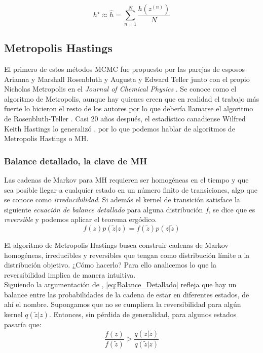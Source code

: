 \begin{equation*}
h^\star \approx \hat{h} = \sum\limits_{n=1}^N \dfrac{h\left(z^{(n)}\right)}{N}
\end{equation*}

\subsection{Metropolis Hastings}

 El primero de estos métodos MCMC fue propuesto por las parejas de esposos Arianna y Marshall Rosenbluth y Augusta y Edward Teller junto con el propio Nicholas Metropolis en el \textit{Journal of Chemical Physics} \parencite{Metropolis53}. Se conoce como el algoritmo de Metropolis, aunque hay quienes creen que en realidad el trabajo más fuerte lo hicieron el resto de los autores por lo que debería llamarse el algoritmo de Rosenbluth-Teller \parencite{Gubernatis05}. Casi 20 años después, el estadístico canadiense Wilfred Keith Hastings lo generalizó \parencite{Hastings70}, por lo que podemos hablar de algoritmos de Metropolis Hastings o MH.

\subsubsection*{Balance detallado, la clave de MH}
 
Las cadenas de Markov para MH requieren ser homogéneas en el tiempo y que sea posible llegar a cualquier estado en un número finito de transiciones, algo que se conoce como \textit{irreducibilidad}. Si además el kernel de transición satisface la siguiente \textit{ecuación de balance detallado} para alguna distribución $f$, se dice que es \textit{reversible} y podemos aplicar el teorema ergódico.
\begin{equation}
\label{eq:Balance_Detallado}
f(z)p(\tilde{z}|z)=f(\tilde{z})p(z|\tilde{z})
\end{equation}

El algoritmo de Metropolis Hastings busca construir cadenas de Markov homogéneas, irreducibles y reversibles que tengan como distribución límite a la distribución objetivo. ¿Cómo hacerlo? Para ello analicemos lo que la reversibilidad implica de manera intuitiva.\\

Siguiendo la argumentación de \textcite{ChibGreenberg95}, \eqref{eq:Balance_Detallado} refleja que hay un balance entre las probabilidades de la cadena de estar en diferentes estados, de ahí el nombre. Supongamos que no se cumpliera la reversibilidad para algún kernel $q(\tilde{z}|z)$. Entonces, sin pérdida de generalidad, para algunos estados pasaría que:
\begin{equation}
\label{eq:Inbalance_Detallado}
\dfrac{f(z)}{f(\tilde{z})}>\dfrac{q(z|\tilde{z})}{q(\tilde{z}|z)}
\end{equation}

